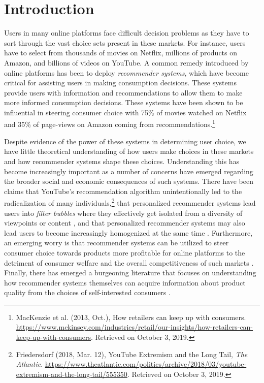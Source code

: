 \documentclass[format=acmsmall, review=false]{acmart}
\title[\PaperTitle]{\PaperTitle}
\author{Submission 20}
\begin{document}
\maketitle


\section{Introduction}

Users in many online platforms face difficult decision problems as they have to sort through the vast choice sets present in these markets. For instance, users have to select from thousands of movies on Netflix, millions of products on Amazon, and billions of videos on YouTube. A common remedy introduced by online platforms has been to deploy \textit{recommender systems}, which have become critical for assisting users in making consumption decisions. These systems provide users with information and recommendations to allow them to make more informed consumption decisions. These systems have been shown to be influential in steering consumer choice with 75\% of movies watched on Netflix and 35\% of page-views on Amazon coming from recommendations.\footnote{MacKenzie et al. (2013, Oct.),  How retailers can keep up with consumers. 
\url{https://www.mckinsey.com/industries/retail/our-insights/how-retailers-can-keep-up-with-consumers}. 
Retrieved on October 3, 2019.}
\par 
Despite evidence of the power of these systems in determining user choice, we have little theoretical understanding of how users make choices in these markets and how recommender systems shape these choices. Understanding this has become increasingly important as a number of concerns have emerged regarding the broader social and economic consequences of such systems. There have been claims that YouTube's recommendation algorithm unintentionally led to the radicalization of many individuals,\footnote{Friedersdorf (2018, Mar. 12), YouTube Extremism and the Long Tail, 
\textit{The Atlantic}. 
\url{https://www.theatlantic.com/politics/archive/2018/03/youtube-extremism-and-the-long-tail/555350}. Retrieved on October 3, 2019.} 
that personalized recommender systems lead users into \textit{filter bubbles} 
where they effectively get isolated from a diversity of viewpoints or content 
\cite{pariser2011filter}, and that personalized recommender systems may also lead users to become increasingly homogenized at the same time \cite{chaney2018algorithmic, hosanagar2013will}. Furthermore, an emerging worry is that recommender systems can be utilized to steer consumer choice towards products more profitable for online platforms to the detriment of consumer welfare and the overall competitiveness of such markets \citep{aridor2020recommender, bourreau2018streaming, DeCorniereTaylor2019RAND}. Finally, there has emerged a burgeoning literature that focuses on understanding how recommender systems themselves can acquire information about product quality from the choices of self-interested consumers \cite{kremer2014implementing, che2017recommender,frazier2014incentivizing,mansour2015bayesian}. 
\end{document}

